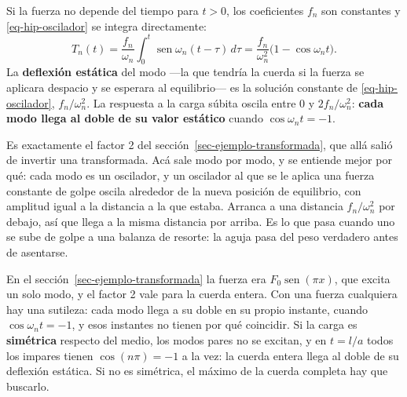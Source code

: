 \documentclass[
  spanish,
  a4paper,
]{scrbook}
\theoremstyle{definition}
\theoremstyle{plain}
\theoremstyle{definition}
\theoremstyle{plain}
\theoremstyle{definition}
\theoremstyle{remark}
\begin{document}
\begin{tcolorbox}[enhanced jigsaw, arc=.35mm, bottomrule=.15mm, bottomtitle=1mm, breakable, colback=white, colbacktitle=quarto-callout-tip-color!10!white, colframe=quarto-callout-tip-color-frame, coltitle=black, left=2mm, leftrule=.75mm, opacityback=0, opacitybacktitle=0.6, rightrule=.15mm, title=\textcolor{quarto-callout-tip-color}{\faLightbulb}\hspace{0.5em}{Solución}, titlerule=0mm, toprule=.15mm, toptitle=1mm]

Si la fuerza no depende del tiempo para \(t>0\), los coeficientes
\(f_n\) son constantes y \ref{eq-hip-oscilador} se integra directamente:
\[
T_n(t) = \frac{f_n}{\omega_n}\int_0^t\operatorname{sen}\omega_n(t-\tau)\,d\tau
= \frac{f_n}{\omega_n^2}\big(1 - \cos\omega_nt\big).
\] La \textbf{deflexión estática} del modo ---la que tendría la cuerda
si la fuerza se aplicara despacio y se esperara al equilibrio--- es la
solución constante de \ref{eq-hip-oscilador}, \(f_n/\omega_n^2\). La
respuesta a la carga súbita oscila entre \(0\) y \(2f_n/\omega_n^2\):
\textbf{cada modo llega al doble de su valor estático} cuando
\(\cos\omega_nt = -1\).

Es exactamente el factor 2 del sección~\ref{sec-ejemplo-transformada},
que allá salió de invertir una transformada. Acá sale modo por modo, y
se entiende mejor por qué: cada modo es un oscilador, y un oscilador al
que se le aplica una fuerza constante de golpe oscila alrededor de la
nueva posición de equilibrio, con amplitud igual a la distancia a la que
estaba. Arranca a una distancia \(f_n/\omega_n^2\) por debajo, así que
llega a la misma distancia por arriba. Es lo que pasa cuando uno se sube
de golpe a una balanza de resorte: la aguja pasa del peso verdadero
antes de asentarse.

En el sección~\ref{sec-ejemplo-transformada} la fuerza era
\(F_0\operatorname{sen}(\pi x)\), que excita un solo modo, y el factor 2
vale para la cuerda entera. Con una fuerza cualquiera hay una sutileza:
cada modo llega a su doble en su propio instante, cuando
\(\cos\omega_nt = -1\), y esos instantes no tienen por qué coincidir. Si
la carga es \textbf{simétrica} respecto del medio, los modos pares no se
excitan, y en \(t = l/a\) todos los impares tienen \(\cos(n\pi) = -1\) a
la vez: la cuerda entera llega al doble de su deflexión estática. Si no
es simétrica, el máximo de la cuerda completa hay que buscarlo.

\end{tcolorbox}
\end{document}
